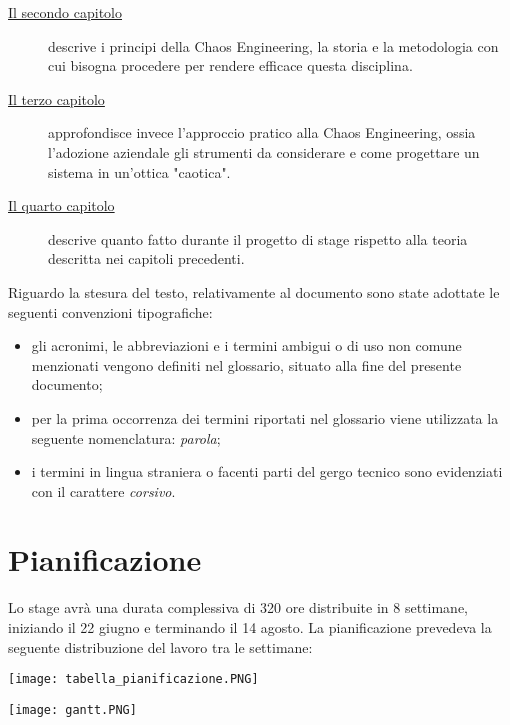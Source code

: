 \begin{description}
    \item[{\hyperref[cap:processi-metodologie]{Il secondo capitolo}}] descrive i principi della Chaos Engineering, la storia e la metodologia con cui bisogna procedere per rendere efficace questa disciplina.
    
    \item[{\hyperref[cap:descrizione-stage]{Il terzo capitolo}}] approfondisce invece l'approccio pratico alla Chaos Engineering, ossia l'adozione aziendale gli strumenti da considerare e come progettare un sistema in un'ottica "caotica".
    
    \item[{\hyperref[cap:analisi-requisiti]{Il quarto capitolo}}] descrive quanto fatto durante il progetto di stage rispetto alla teoria descritta nei capitoli precedenti.

\end{description}

Riguardo la stesura del testo, relativamente al documento sono state adottate le seguenti convenzioni tipografiche:
\begin{itemize}
	\item gli acronimi, le abbreviazioni e i termini ambigui o di uso non comune menzionati vengono definiti nel glossario, situato alla fine del presente documento;
	\item per la prima occorrenza dei termini riportati nel glossario viene utilizzata la seguente nomenclatura: \emph{parola}\glsfirstoccur;
	\item i termini in lingua straniera o facenti parti del gergo tecnico sono evidenziati con il carattere \emph{corsivo}.
\end{itemize}

\section{Pianificazione}
Lo stage avrà una durata complessiva di 320 ore distribuite in 8 settimane, iniziando il 22 giugno e terminando il 14 agosto.
La pianificazione prevedeva la seguente distribuzione del lavoro tra le settimane:
\begin{center}
    \centering
    \texttt{[image: tabella\_pianificazione.PNG]}
    \label{tab:tabella-ore-stage}
\end{center}
\begin{center}
    \centering
    \texttt{[image: gantt.PNG]}
    \label{tab:gantt-stage}
\end{center}



